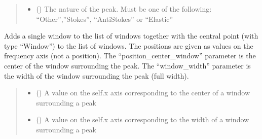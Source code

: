 \documentclass[letterpaper,10pt,english]{sphinxmanual}
\begin{document}
\begin{fulllineitems}
\begin{fulllineitems}
\begin{quote}
\begin{description}
\begin{itemize}
\item {} 
\sphinxAtStartPar
{} () \textendash{} The nature of the peak. Must be one of the following: “Other”,”Stokes”, “Anti\sphinxhyphen{}Stokes” or “Elastic”

\end{itemize}

\end{description}\end{quote}

\end{fulllineitems}


\begin{fulllineitems}
\label{\detokenize{source/_autosummary/HDF5_BLS_treat.Treat:HDF5_BLS_treat.Treat.add_window}}
\pysigstartsignatures
\pysiglinewithargsret
{}
{\sphinxparamcomma {}}
{}
\pysigstopsignatures
\sphinxAtStartPar
Adds a single window to the list of windows together with the central point (with type “Window”) to the list of windows.
The positions are given as values on the frequency axis (not a position).
The “position\_center\_window” parameter is the center of the window surrounding the peak. The “window\_width” parameter is the width of the window surrounding the peak (full width).
\begin{quote}\begin{description}
\begin{itemize}
\item {} 
\sphinxAtStartPar
{} () \textendash{} A value on the self.x axis corresponding to the center of a window surrounding a peak

\item {} 
\sphinxAtStartPar
{} () \textendash{} A value on the self.x axis corresponding to the width of a window surrounding a peak


\end{itemize}
\end{description}
\end{quote}
\end{fulllineitems}
\end{fulllineitems}
\end{document}
